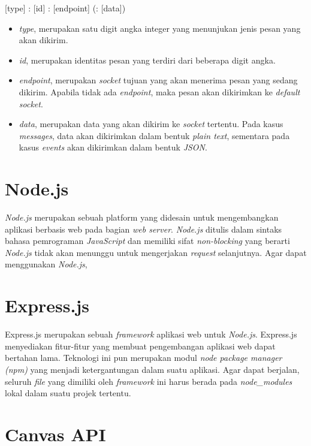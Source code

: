 [type] : [id] : [endpoint] (: [data])

\begin{itemize}
	\item \textit{type}, merupakan satu digit angka integer yang menunjukan jenis pesan yang akan dikirim.
	\item \textit{id}, merupakan identitas pesan yang terdiri dari beberapa digit angka.
	\item \textit{endpoint}, merupakan \textit{socket} tujuan yang akan menerima pesan yang sedang dikirim. Apabila tidak ada \textit{endpoint}, maka pesan akan dikirimkan ke \textit{default socket}.
	\item \textit{data}, merupakan data yang akan dikirim ke \textit{socket} tertentu. Pada kasus \textit{messages}, data akan dikirimkan dalam bentuk \textit{plain text}, sementara pada kasus \textit{events} akan dikirimkan dalam bentuk \textit{JSON}.
\end{itemize}

\section{Node.js}
\label{sec:Node.js}

\textit{Node.js} merupakan sebuah platform yang didesain untuk mengembangkan aplikasi berbasis web pada bagian \textit{web server}. \textit{Node.js} ditulis dalam sintaks bahasa pemrograman \textit{JavaScript} dan memiliki sifat \textit{non-blocking} yang berarti \textit{Node.js} tidak akan menunggu untuk mengerjakan \textit{request} selanjutnya. Agar dapat menggunakan \textit{Node.js}, 


\section{Express.js}
\label{sec:Express.js}

Express.js merupakan sebuah \textit{framework} aplikasi web untuk \textit{Node.js}. Express.js menyediakan fitur-fitur yang membuat pengembangan aplikasi web dapat bertahan lama. Teknologi ini pun merupakan modul \textit{node package manager (npm)} yang menjadi ketergantungan dalam suatu aplikasi. Agar dapat berjalan, seluruh \textit{file} yang dimiliki oleh \textit{framework} ini harus berada pada \textit{node\_modules} lokal dalam suatu projek tertentu. 


\section{Canvas API}
\label{sec:Canvas API}
 
